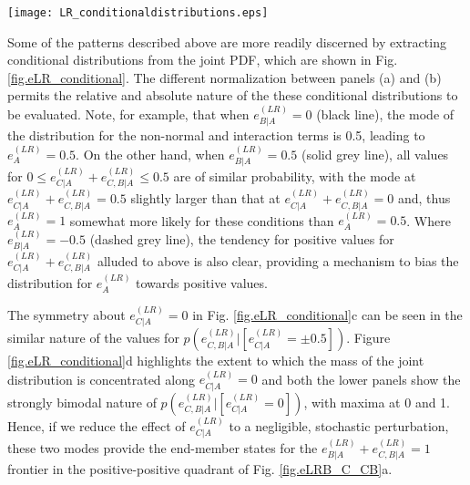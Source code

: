 \documentclass[preprint,amssymb,amsmath,aip,cha]{revtex4-1}
\begin{document}
\begin{figure*}
  \texttt{[image: LR\_conditionaldistributions.eps]}
\caption{Conditional distributions extracted from the joint distribution functions in Fig.\ref{fig.eLRB_C_CB}. The upper panels are related to Fig.\ref{fig.eLRB_C_CB}a and show probabilities for $e^{(LR)}_{C|A} + e^{(LR)}_{C,B|A}$ given $e^{(LR)}_{B|A} = 0$ (black line), $e^{(LR)}_{B|A} = 0.5$ (solid grey line), and $e^{(LR)}_{B|A} = -0.5$ (dashed grey line). The lower panels are extracted from Fig.\ref{fig.eLRB_C_CB}b and show probabilities for $e^{(LR)}_{C,B|A}$ given $e^{(LR)}_{C|A} = 0$ (black line), $e^{(LR)}_{C|A} = 0.5$ (solid grey line), and $e^{(LR)}_{C|A} = -0.5$ (dashed grey line). The left-hand panels are normalized such that the extracted values along this transect integrates to 1. The right-hand panels are normalized such that the full joint distribution integrates to 1. 
}
\label{fig.eLR_conditional}       %
\end{figure*}

Some of the patterns described above are more readily discerned by extracting conditional distributions from the joint PDF, which are shown in Fig. \ref{fig.eLR_conditional}. The different normalization between panels (a) and (b) permits the relative and absolute nature of the these conditional distributions to be evaluated. Note, for example, that when $e^{(LR)}_{B|A} = 0$ (black line), the mode of the distribution for the non-normal and interaction terms is 0.5, leading to $e^{(LR)}_{A} = 0.5$. On the other hand, when $e^{(LR)}_{B|A} = 0.5$ (solid grey line), all values for $0 \le e^{(LR)}_{C|A} + e^{(LR)}_{C,B|A} \le 0.5$ are of similar probability, with the mode at $e^{(LR)}_{C|A} + e^{(LR)}_{C,B|A} = 0.5$ slightly larger than that at $e^{(LR)}_{C|A} + e^{(LR)}_{C,B|A} = 0$ and, thus $e^{(LR)}_{A} = 1$ somewhat more likely for these conditions than $e^{(LR)}_{A} = 0.5$. Where $e^{(LR)}_{B|A} = -0.5$ (dashed grey line), the tendency for positive values for $e^{(LR)}_{C|A} + e^{(LR)}_{C,B|A}$ alluded to above is also clear, providing a mechanism to bias the distribution for $e^{(LR)}_{A}$ towards positive values.

The symmetry about $e^{(LR)}_{C|A} = 0$ in Fig. \ref{fig.eLR_conditional}c can be seen in the similar nature of the values for $p(e^{(LR)}_{C,B|A} | [e^{(LR)}_{C|A} = \pm 0.5])$. Figure \ref{fig.eLR_conditional}d highlights the extent to which the mass of the joint distribution is concentrated along $e^{(LR)}_{C|A} = 0$ and both the lower panels show the strongly bimodal nature of $p(e^{(LR)}_{C,B|A} | [e^{(LR)}_{C|A} = 0])$, with maxima at 0 and 1. Hence, if we reduce the effect of $e^{(LR)}_{C|A}$ to a negligible, stochastic perturbation, these two modes provide the end-member states for the $e^{(LR)}_{B|A} + e^{(LR)}_{C,B|A} = 1$ frontier in the positive-positive quadrant of Fig. \ref{fig.eLRB_C_CB}a.
\end{document}
